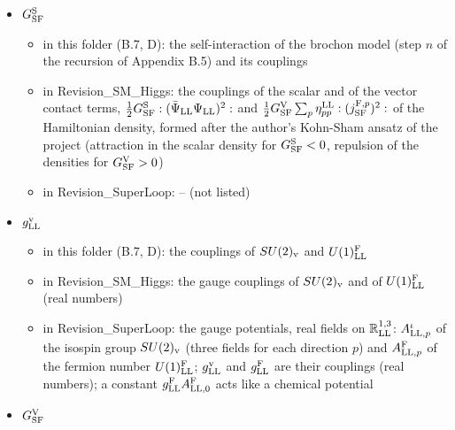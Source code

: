 \documentclass[
  10pt,
]{article}
\providecommand{\tightlist}{%
  \setlength{\itemsep}{0pt}\setlength{\parskip}{0pt}}
\begin{document}
\begin{itemize}
  \begin{itemize}
  \tightlist
  \item
    in this folder (B.7, D): the couplings of \(SU(2)_{\rm v}\) and
    \(U(1)^{\rm F}_{\rm LL}\)
  \item
    in Revision\_SM\_Higgs: the gauge couplings of \(SU(2)_{\rm v}\) and
    of \(U(1)^{\rm F}_{\rm LL}\) (real numbers)
  \item
    in Revision\_SuperLoop: the gauge potentials, real fields on
    \(\mathbb R^{1,3}_{\rm LL}\): \(A^\iota_{{\rm LL},p}\) of the
    isospin group \(SU(2)_{\rm v}\) (three fields for each direction
    \(p\)) and \(A^{\rm F}_{{\rm LL},p}\) of the fermion number
    \(U(1)^{\rm F}_{\rm LL}\); \(g^{\rm v}_{\rm LL}\) and
    \(g^{\rm F}_{\rm LL}\) are their couplings (real numbers); a
    constant \(g^{\rm F}_{\rm LL}A^{\rm F}_{{\rm LL},0}\) acts like a
    chemical potential
  \end{itemize}
\item
  \(G^{\rm S}_{\rm SF}\)

  \begin{itemize}
  \tightlist
  \item
    in this folder (B.7, D): the self-interaction of the brochon model
    (step \(n\) of the recursion of Appendix B.5) and its couplings
  \item
    in Revision\_SM\_Higgs: the couplings of the scalar and of the
    vector contact terms,
    \(\tfrac12G^{\rm S}_{\rm SF}:(\bar\Psi_{\rm LL}\Psi_{\rm LL})^2:\)
    and
    \(\tfrac12G^{\rm V}_{\rm SF}\sum_p\eta^{\rm LL}_{pp}:(j^{{\rm F},p}_{\rm SF})^2:\)
    of the Hamiltonian density, formed after the author's Kohn-Sham
    ansatz of the project (attraction in the scalar density for
    \(G^{\rm S}_{\rm SF}<0\), repulsion of the densities for
    \(G^{\rm V}_{\rm SF}>0\))
  \item
    in Revision\_SuperLoop: -- (not listed)
  \end{itemize}
\item
  \(g^{\rm v}_{\rm LL}\)

  \begin{itemize}
  \tightlist
  \item
    in this folder (B.7, D): the couplings of \(SU(2)_{\rm v}\) and
    \(U(1)^{\rm F}_{\rm LL}\)
  \item
    in Revision\_SM\_Higgs: the gauge couplings of \(SU(2)_{\rm v}\) and
    of \(U(1)^{\rm F}_{\rm LL}\) (real numbers)
  \item
    in Revision\_SuperLoop: the gauge potentials, real fields on
    \(\mathbb R^{1,3}_{\rm LL}\): \(A^\iota_{{\rm LL},p}\) of the
    isospin group \(SU(2)_{\rm v}\) (three fields for each direction
    \(p\)) and \(A^{\rm F}_{{\rm LL},p}\) of the fermion number
    \(U(1)^{\rm F}_{\rm LL}\); \(g^{\rm v}_{\rm LL}\) and
    \(g^{\rm F}_{\rm LL}\) are their couplings (real numbers); a
    constant \(g^{\rm F}_{\rm LL}A^{\rm F}_{{\rm LL},0}\) acts like a
    chemical potential
  \end{itemize}
\item
  \(G^{\rm V}_{\rm SF}\)


\end{itemize}
\end{document}
